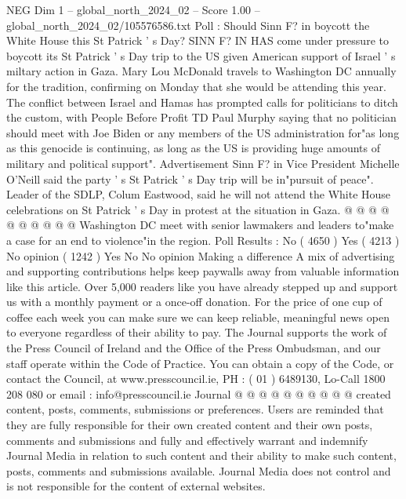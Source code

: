 \begin{textsample}{NEG Dim 1 – global\_north\_2024\_02 – Score 1.00 – global\_north\_2024\_02/105576586.txt}  \label{ex:f1_neg_178}
Poll : Should Sinn F? in boycott the White House this St Patrick ' s Day?
SINN F?
IN HAS come under pressure to boycott its St Patrick ' s Day trip to the US given American support of Israel ' s miltary action in Gaza.
Mary Lou McDonald travels to Washington DC annually for the tradition, confirming on Monday that she would be attending this year.
The conflict between Israel and Hamas has prompted calls for politicians to ditch the custom, with People Before Profit TD Paul Murphy saying that no politician should meet with Joe Biden or any members of the US administration for"as long as this genocide is continuing, as long as the US is providing huge amounts of military and political support".
Advertisement Sinn F? in Vice President Michelle O'Neill said the party ' s St Patrick ' s Day trip will be in"pursuit of peace".
Leader of the SDLP, Colum Eastwood, said he will not attend the White House celebrations on St Patrick ' s Day in protest at the situation in Gaza. @ @ @ @ @ @ @ @ @ @ Washington DC meet with senior lawmakers and leaders to"make a case for an end to violence"in the region.
Poll Results : No ( 4650 ) Yes ( 4213 ) No opinion ( 1242 ) Yes No No opinion Making a difference A mix of advertising and supporting contributions helps keep paywalls away from valuable information like this article.
Over 5,000 readers like you have already stepped up and support us with a monthly payment or a once-off donation.
For the price of one cup of coffee each week you can make sure we can keep reliable, meaningful news open to everyone regardless of their ability to pay.
The Journal supports the work of the Press Council of Ireland and the Office of the Press Ombudsman, and our staff operate within the Code of Practice.
You can obtain a copy of the Code, or contact the Council, at www.presscouncil.ie, PH : ( 01 ) 6489130, Lo-Call 1800 208 080 or email : info@presscouncil.ie Journal @ @ @ @ @ @ @ @ @ @ created content, posts, comments, submissions or preferences.
Users are reminded that they are fully responsible for their own created content and their own posts, comments and submissions and fully and effectively warrant and indemnify Journal Media in relation to such content and their ability to make such content, posts, comments and submissions available.
Journal Media does not control and is not responsible for the content of external websites.

\end{textsample}
